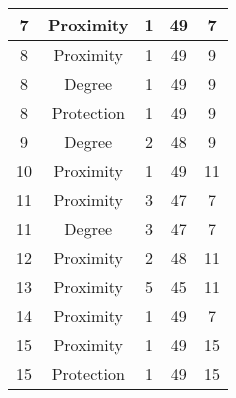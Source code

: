 \documentclass[results.tex]{subfiles}
\begin{document}
\begin{center}
\begin{tabular}{| c || c | c | c | c |}
            \hline
            7                       & Proximity                    & 1                      & 49                      & 7                    \\
            \hline
            8                       & Proximity                    & 1                      & 49                      & 9                    \\
            \hline
            8                       & Degree                       & 1                      & 49                      & 9                    \\
            \hline
            8                       & Protection                   & 1                      & 49                      & 9                    \\
            \hline
            9                       & Degree                       & 2                      & 48                      & 9                    \\
            \hline
            10                      & Proximity                    & 1                      & 49                      & 11                   \\
            \hline
            11                      & Proximity                    & 3                      & 47                      & 7                    \\
            \hline
            11                      & Degree                       & 3                      & 47                      & 7                    \\
            \hline
            12                      & Proximity                    & 2                      & 48                      & 11                   \\
            \hline
            13                      & Proximity                    & 5                      & 45                      & 11                   \\
            \hline
            14                      & Proximity                    & 1                      & 49                      & 7                    \\
            \hline
            15                      & Proximity                    & 1                      & 49                      & 15                   \\
            \hline
            15                      & Protection                   & 1                      & 49                      & 15                   \\

\end{tabular}
\end{center}
\end{document}
